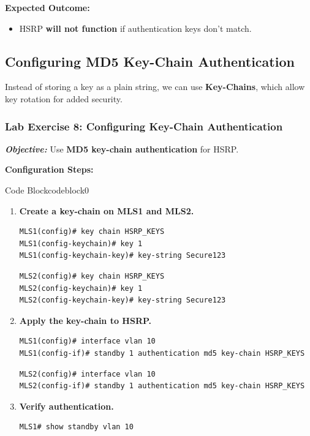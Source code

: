 \documentclass[a4paper]{book}
\begin{document}
\textbf{Expected Outcome:}
\begin{itemize}
\item HSRP \textbf{will not function} if authentication keys don’t match.
\end{itemize}

\subsection{Configuring MD5 Key-Chain Authentication}
Instead of storing a key as a plain string, we can use \textbf{Key-Chains}, which allow key rotation 
for added security.

\subsubsection{Lab Exercise 8: Configuring Key-Chain Authentication}
\textbf{\textit{Objective:}} Use \textbf{MD5 key-chain authentication} for HSRP.

\vspace{1.5em}

\textbf{Configuration Steps:}

\vspace{1.5em}


\begin{ocg}{Code Block}{codeblock}{0}

\vspace{0.5cm}

\begin{enumerate}
\item \textbf{Create a key-chain on MLS1 and MLS2.}
\begin{lstlisting}
MLS1(config)# key chain HSRP_KEYS
MLS1(config-keychain)# key 1
MLS1(config-keychain-key)# key-string Secure123
\end{lstlisting}
\begin{lstlisting}
MLS2(config)# key chain HSRP_KEYS
MLS2(config-keychain)# key 1
MLS2(config-keychain-key)# key-string Secure123
\end{lstlisting}

\item \textbf{Apply the key-chain to HSRP.}
\begin{lstlisting}
MLS1(config)# interface vlan 10
MLS1(config-if)# standby 1 authentication md5 key-chain HSRP_KEYS
\end{lstlisting}
\begin{lstlisting}
MLS2(config)# interface vlan 10
MLS2(config-if)# standby 1 authentication md5 key-chain HSRP_KEYS
\end{lstlisting}

\item \textbf{Verify authentication.}
\begin{lstlisting}
MLS1# show standby vlan 10
\end{lstlisting}
\end{enumerate}
\end{ocg}
\end{document}
